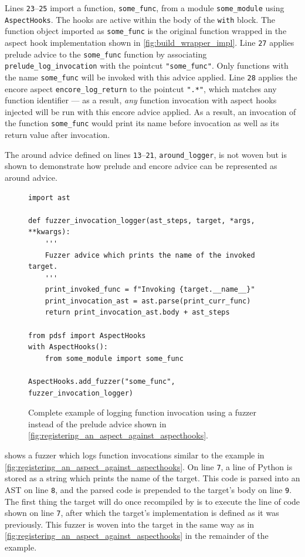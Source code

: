 Lines \texttt{23}--\texttt{25} import a function, \lstinline{some_func}, from a
module \lstinline{some_module} using \lstinline{AspectHooks}. The hooks are
active within the body of the \lstinline{with} block. The function object
imported as
\lstinline{some_func} is the original function wrapped in the aspect hook
implementation shown in \cref{fig:build_wrapper_impl}. Line \texttt{27} applies
prelude advice to the \lstinline{some_func} function by associating
\lstinline{prelude_log_invocation} with the pointcut \lstinline{"some_func"}.
Only functions with the name \lstinline{some_func} will be invoked with this
advice applied. Line \texttt{28} applies the encore aspect
\lstinline{encore_log_return} to the pointcut \lstinline{".*"}, which matches
any function identifier --- as a result, \emph{any} function invocation with
aspect hooks injected will be run with this encore advice applied. As a result,
an invocation of the function \lstinline{some_func} would print its name before
invocation as well as its return value after invocation. 

The around advice defined on lines \texttt{13}--\texttt{21},
\lstinline{around_logger}, is not woven but is shown to demonstrate how prelude
and encore advice can be represented as around advice.

\begin{figure}
    \begin{lstlisting}[style=footnotesize_python]
import ast

def fuzzer_invocation_logger(ast_steps, target, *args, **kwargs):
    '''
    Fuzzer advice which prints the name of the invoked target.
    '''
    print_invoked_func = f"Invoking {target.__name__}"
    print_invocation_ast = ast.parse(print_curr_func)
    return print_invocation_ast.body + ast_steps

from pdsf import AspectHooks
with AspectHooks():
    from some_module import some_func

AspectHooks.add_fuzzer("some_func", fuzzer_invocation_logger)
    \end{lstlisting}
    \caption{Complete example of logging function invocation using a fuzzer instead of the prelude advice shown in \cref{fig:registering_an_aspect_against_aspecthooks}.}
    \label{fig:fuzzer_logging_example}
\end{figure}

 shows a fuzzer which logs function invocations
similar to the example in \cref{fig:registering_an_aspect_against_aspecthooks}.
On line \texttt{7}, a line of Python is stored as a string which prints the name of the
target. This code is parsed into an AST on line \texttt{8}, and the parsed code
is prepended to the target's body on line \texttt{9}. The first thing the target
will do once recompiled by \pdsfthree{} is to execute the line of code shown on line
\texttt{7}, after which the target's implementation is defined as it was
previously. This fuzzer is woven into the target in the same way as in
\cref{fig:registering_an_aspect_against_aspecthooks} in the remainder of the
example.


